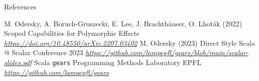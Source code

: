 \documentclass[aspectratio=1610,xcolor=dvipsnames,handout]{beamer}
\begin{document}
\begin{frame}{References}
  \footnotesize{
      \begin{thebibliography}{99}
           M. Odersky, A. Boruch-Gruszecki, E. Lee, J. Brachthäuser, O. Lhoták (2022)
          \newblock Scoped Capabilities for Polymorphic Effects
          \newblock \emph{\href{https://doi.org/10.48550/arXiv.2207.03402}{https://doi.org/10.48550/arXiv.2207.03402}}
           M. Odersky (2023)
          \newblock Direct Style Scala @ Scalar Conference 2023 
          \newblock \emph{\href{https://github.com/lampepfl/gears/blob/main/scalar-slides.pdf}{https://github.com/lampepfl/gears/blob/main/scalar-slides.pdf}}
           Scala \texttt{gears}
          \newblock Programming Methods Laboratory EPFL
          \newblock \emph{\href{https://github.com/lampepfl/gears}{https://github.com/lampepfl/gears}}
      \end{thebibliography}
  }
\end{frame}
\end{document}
